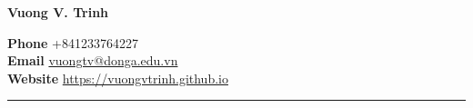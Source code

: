 \documentclass[a4paper,11pt]{article}
\newcommand\tab[1][1cm]{\hspace*{#1}}
\begin{document}
{\hspace*{-\marginparsep minus \marginparwidth} 
\begin{minipage}[t]{\textwidth+\marginparwidth+\marginparsep} 
{\LARGE \bfseries {Vuong V. Trinh}} 

\vspace{0.2cm} 
\textbf{Phone} \tab[0.75cm] {\color{darkblue} +841233764227} \\
\textbf{Email} \tab[0.75cm] \href{mailto:vuongtv@donga.edu.vn}{vuongtv@donga.edu.vn} \\
\textbf{Website} \tab[0.435cm]  \href{https://vuongvtrinh.github.io}{https://vuongvtrinh.github.io} \\
\vspace{-0.6cm}

\rule{\columnwidth}{1pt}
\end{minipage}}

\vspace{0.5cm}
\end{document}
